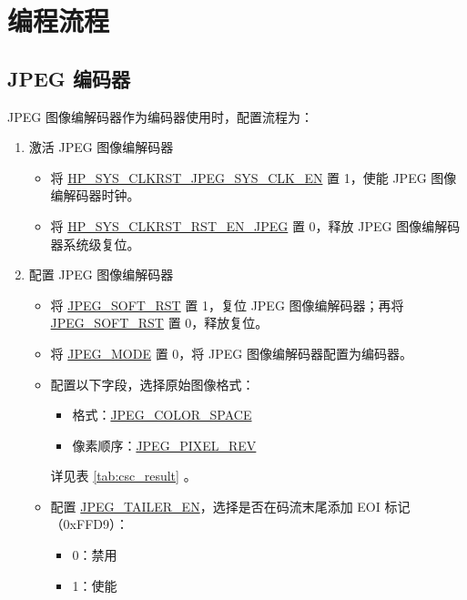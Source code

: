 \documentclass[main\_\_CN.tex]{subfiles}
\begin{document}

\section{编程流程}
\label{sec:jpegcodec-prog-procedures}

\subsection{JPEG 编码器}
\label{sec:jpegcodec-enc-prog}

JPEG 图像编解码器作为编码器使用时，配置流程为：
\begin{enumerate}
    \item 激活 JPEG 图像编解码器
    \begin{itemize}
        \item 将 \hyperref[fielddesc:HPSYSCLKRSTJPEGSYSCLKEN]{HP\_SYS\_CLKRST\_JPEG\_SYS\_CLK\_EN} 置 1，使能 JPEG 图像编解码器时钟。
        \item 将 \hyperref[fielddesc:HPSYSCLKRSTRSTENJPEG]{HP\_SYS\_CLKRST\_RST\_EN\_JPEG} 置 0，释放 JPEG 图像编解码器系统级复位。
    \end{itemize}
    \item 配置 JPEG 图像编解码器
    \begin{itemize}
        \item 将 \hyperref[fielddesc:JPEGSOFTRST]{JPEG\_SOFT\_RST} 置 1，复位 JPEG 图像编解码器；再将 \hyperref[fielddesc:JPEGSOFTRST]{JPEG\_SOFT\_RST} 置 0，释放复位。
        \item 将 \hyperref[fielddesc:JPEGMODE]{JPEG\_MODE} 置 0，将 JPEG 图像编解码器配置为编码器。
        \item 配置以下字段，选择原始图像格式：
        \begin{itemize}
            \item 格式：\hyperref[fielddesc:JPEGCOLORSPACE]{JPEG\_COLOR\_SPACE}
            \item 像素顺序：\hyperref[fielddesc:JPEGPIXELREV]{JPEG\_PIXEL\_REV}
        \end{itemize}
        详见表 \ref{tab:csc_result} \textit{}。
        \item 配置 \hyperref[fielddesc:JPEGTAILEREN]{JPEG\_TAILER\_EN}，选择是否在码流末尾添加 EOI 标记（0xFFD9）：
        \begin{itemize}
            \item 0：禁用
            \item 1：使能

\end{itemize}
\end{itemize}
\end{enumerate}
\end{document}

